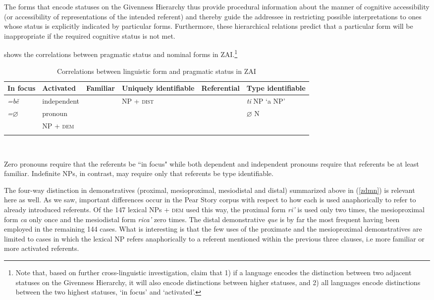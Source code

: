 The forms that encode statuses on the Givenness Hierarchy thus provide procedural information about the manner of cognitive accessibility (or accessibility of representations of the intended referent) and thereby guide the addressee in restricting possible interpretations to ones whose status is explicitly indicated by particular forms. Furthermore, these  hierarchical relations predict that a particular form will be inappropriate if the required cognitive status is not met. 


 shows the correlations between pragmatic status and nominal forms in ZAI.\footnote{Note that, based on further cross-linguistic investigation, \citet{gundel2010} claim that 1) if a language encodes the distinction between two adjacent statuses on the Givenness Hierarchy, it will also encode distinctions between higher statuses, and 2) all languages encode distinctions between the two highest statuses, `in focus' and `activated'.}


\begin{table}

\begin{tabularx}{\textwidth}{lllQlQ}
\lsptoprule
 {In} {focus}& {Activated} & {Familiar} & {Uniquely} {identifiable} & {Referential} & {Type} {identifiable} \\ 

 
\midrule
 \textit{=b\v{e}}  & independent &  & NP + \textsc{dist} &  & \textit{ti} NP `a NP' \\
  \textit{=$\varnothing$}  &  pronoun &  & & & {$\varnothing$ N}   \\
  & NP + \textsc{dem} & & & &  \\

\lspbottomrule
\end{tabularx}\\
\caption{{Correlations between linguistic form and pragmatic status in ZAI}}
\label{izcorrelations}

\end{table}


Zero pronouns require that the referents be ``in focus" while both dependent and independent pronouns require that referents be at least familiar. Indefinite NPs, in contrast, may require only that referents be type identifiable. 

The four-way distinction in demonstratives (proximal, mesioproximal, mesiodistal and distal) summarized above in (\ref{zdmn}) is relevant here as well. As we saw, important differences occur in the Pear Story corpus with respect to how each is used anaphorically to refer to already introduced referents. Of the 147 lexical NPs + \textsc{dem} used this way, the proximal form \textit{ri'} is used only two times, the mesioproximal form \textit{ca} only once and the mesiodistal form \textit{rica'} zero times. The distal demonstrative \textit{que} is by far the most frequent having been employed in the remaining 144 cases. What is interesting is that the few uses of the proximate and the mesioproximal demonstratives are limited to cases in which the lexical NP refers anaphorically to a referent mentioned within the previous three clauses, i.e more familiar or more activated referents. 

